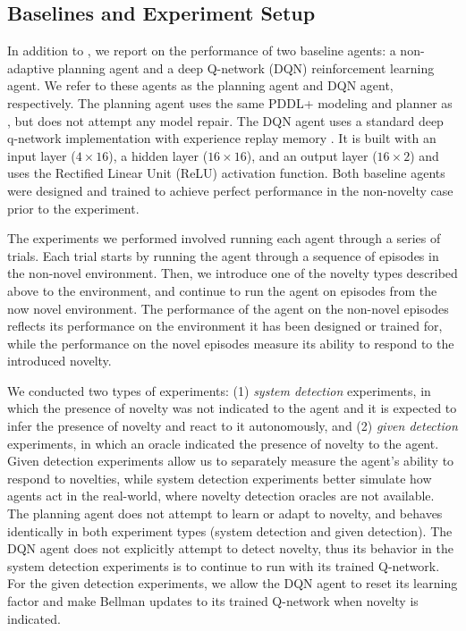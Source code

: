 \documentclass{article}
\begin{document}


\subsection{Baselines and Experiment Setup}

In addition to \hydra, we report on the performance of two baseline agents: a non-adaptive planning agent and a deep Q-network (DQN) reinforcement learning agent. 
We refer to these agents as the planning agent and DQN agent, respectively. 
The planning agent uses the same PDDL+ modeling and planner as \hydra, but does not attempt any model repair.  
The DQN agent uses a standard deep q-network implementation with experience replay memory \cite{mnih2013playing}. It is built with an input layer ($4 \times 16$), a hidden layer ($16 \times 16$), and an output layer ($16 \times 2$) and uses the Rectified Linear Unit (ReLU) activation function.   
Both baseline agents were designed and trained to achieve perfect performance in the non-novelty case prior to the experiment. 



The experiments we performed involved running each agent through a series of trials. 
Each trial starts by running the agent through a sequence of episodes in the non-novel environment. 
Then, we introduce one of the novelty types described above to the environment, and continue to run the agent on episodes from the now novel environment. 
The performance of the agent on the non-novel episodes reflects its performance on the environment it has been designed or trained for, while the performance on the novel episodes measure its ability to respond to the introduced novelty. 


We conducted two types of experiments: (1) \emph{system detection} experiments, in which the presence of novelty was not indicated to the agent and it is expected to infer the presence of novelty and react to it autonomously, and (2) \emph{given detection} experiments, in which an oracle indicated the presence of novelty to the agent. 
Given detection experiments allow us to separately measure the agent's ability to respond to novelties, while system detection experiments better simulate how agents act in the real-world, where novelty detection oracles are not available. 
The planning agent does not attempt to learn or adapt to novelty, and behaves identically in both experiment types (system detection and given detection). 
The DQN agent does not explicitly attempt to detect novelty, thus its behavior in the system detection experiments is to continue to run with its trained Q-network. 
For the given detection experiments, we allow the DQN agent to reset its learning factor and make Bellman updates to its trained Q-network when novelty is indicated.  
\end{document}
